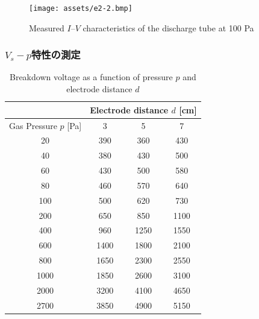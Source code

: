 \documentclass[dvipdfmx]{jsarticle}
\begin{document}
            
            \begin{figure}[H]
            \centering
            \texttt{[image: assets/e2-2.bmp]}
            \caption{Measured $I$–$V$ characteristics of the discharge tube at 100 Pa}\label{fig:4}
            \end{figure}
            
            
        \subsubsection*{$V_s - p$特性の測定}
            
            \begin{table}[H]
            \centering
            \caption{Breakdown voltage as a function of pressure $p$ and electrode distance $d$}
            \label{tab:2}
            \begin{tabular}{cccc}
            \hline
                                & \multicolumn{3}{c}{Electrode distance $d$ [cm]} \\ \hline
            Gas Pressure $p$ [Pa] & 3              & 5              & 7             \\ \hline
            20                    & 390            & 360            & 430           \\
            40                    & 380            & 430            & 500           \\
            60                    & 430            & 500            & 580           \\
            80                    & 460            & 570            & 640           \\
            100                   & 500            & 620            & 730           \\
            200                   & 650            & 850            & 1100          \\
            400                   & 960            & 1250           & 1550          \\
            600                   & 1400           & 1800           & 2100          \\
            800                   & 1650           & 2300           & 2550          \\
            1000                  & 1850           & 2600           & 3100          \\
            2000                  & 3200           & 4100           & 4650          \\
            2700                  & 3850           & 4900           & 5150          \\ \hline
            \end{tabular}
            \end{table}
\end{document}

